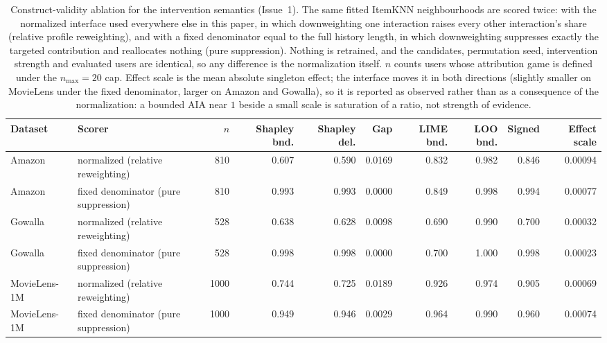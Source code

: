 
\begin{table}[!htbp]\centering\scriptsize\setlength{\tabcolsep}{3pt}
\caption{Construct-validity ablation for the intervention semantics (Issue~1). The same fitted ItemKNN neighbourhoods are scored twice: with the normalized interface used everywhere else in this paper, in which downweighting one interaction raises every other interaction's share (relative profile reweighting), and with a fixed denominator equal to the full history length, in which downweighting suppresses exactly the targeted contribution and reallocates nothing (pure suppression). Nothing is retrained, and the candidates, permutation seed, intervention strength and evaluated users are identical, so any difference is the normalization itself. $n$ counts users whose attribution game is defined under the $n_{\max}=20$ cap. Effect scale is the mean absolute singleton effect; the interface moves it in both directions (slightly smaller on MovieLens under the fixed denominator, larger on Amazon and Gowalla), so it is reported as observed rather than as a consequence of the normalization: a bounded AIA near $1$ beside a small scale is saturation of a ratio, not strength of evidence.}
\label{tab:r9-fixed-denominator}
\begin{tabular}{@{}llrrrrrrrr@{}}
\toprule
Dataset & Scorer & $n$ & Shapley bnd. & Shapley del. & Gap & LIME bnd. & LOO bnd. & Signed & Effect scale \\
\midrule
Amazon & normalized (relative reweighting) & 810 & 0.607 & 0.590 & 0.0169 & 0.832 & 0.982 & 0.846 & 0.00094 \\
Amazon & fixed denominator (pure suppression) & 810 & 0.993 & 0.993 & 0.0000 & 0.849 & 0.998 & 0.994 & 0.00077 \\
Gowalla & normalized (relative reweighting) & 528 & 0.638 & 0.628 & 0.0098 & 0.690 & 0.990 & 0.700 & 0.00032 \\
Gowalla & fixed denominator (pure suppression) & 528 & 0.998 & 0.998 & 0.0000 & 0.700 & 1.000 & 0.998 & 0.00023 \\
MovieLens-1M & normalized (relative reweighting) & 1000 & 0.744 & 0.725 & 0.0189 & 0.926 & 0.974 & 0.905 & 0.00069 \\
MovieLens-1M & fixed denominator (pure suppression) & 1000 & 0.949 & 0.946 & 0.0029 & 0.964 & 0.990 & 0.960 & 0.00074 \\
\bottomrule
\end{tabular}
\end{table}


